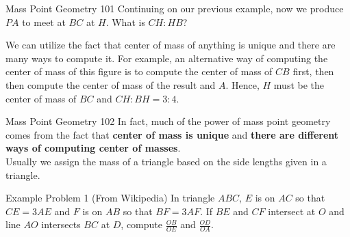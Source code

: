 \documentclass{beamer}
\begin{document}
\begin{frame}{Mass Point Geometry 101}
	Continuing on our previous example, now we produce $PA$ to meet at $BC$ at $H$. What is $CH:HB$?
	\begin{figure}[H]
	\end{figure}
	 {
	We can utilize the fact that center of mass of anything is unique and there are many ways to compute it. For example, an alternative way of computing the center of mass of this figure is to compute the center of mass of $CB$ first, then then compute the center of mass of the result and $A$. Hence, $H$ must be the center of mass of $BC$ and $CH:BH = 3:4$.
	}
\end{frame}

\begin{frame}{Mass Point Geometry 102}
	In fact, much of the power of mass point geometry comes from the fact that \textbf{center of mass is unique} and \textbf{there are different ways of computing center of masses}. \\
	Usually we assign the mass of a triangle based on the side lengths given in a triangle.
\end{frame}

\begin{frame}{Example Problem 1 (From Wikipedia)}
	In triangle $ABC$, $E$ is on $AC$ so that $CE = 3AE$ and $F$ is on  $AB$ so that $BF = 3AF$. If $BE$ and $CF$ intersect at $O$ and line $AO$ intersects $BC$ at $D$, compute $\frac{OB}{OE}$ and $\frac{OD}{OA}$.
\end{frame}
\end{document}
